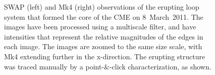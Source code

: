 \documentclass[namedreferences]{solarphysics}
\begin{document}
\begin{article}
\begin{figure}[p]
\caption{SWAP (left) and Mk4 (right) observations of the erupting loop system that formed the core of the CME on 8~March~2011. The images have been processed using a multiscale filter, and have intensities that represent the relative magnitudes of the edges in each image. The images are zoomed to the same size scale, with Mk4 extending further in the x-direction. The erupting structure was traced manually by a point-\&-click characterization, as shown.}
\label{combined_modgrad_points}
\end{figure}


\end{article}
\end{document}
